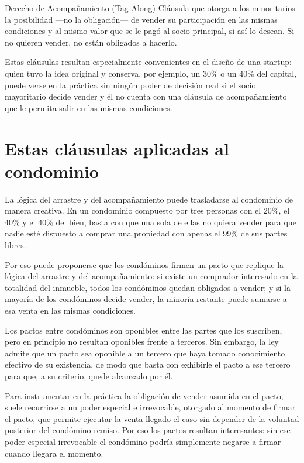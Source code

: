 \documentclass[12pt,oneside]{book}
\begin{document}
\begin{definition}{Derecho de Acompañamiento (Tag-Along)}
Cláusula que otorga a los minoritarios la posibilidad ---no la obligación--- de vender su participación en las mismas condiciones y al mismo valor que se le pagó al socio principal, si así lo desean. Si no quieren vender, no están obligados a hacerlo.
\end{definition}

Estas cláusulas resultan especialmente convenientes en el diseño de una startup: quien tuvo la idea original y conserva, por ejemplo, un 30\% o un 40\% del capital, puede verse en la práctica sin ningún poder de decisión real si el socio mayoritario decide vender y él no cuenta con una cláusula de acompañamiento que le permita salir en las mismas condiciones.

\section{Estas cláusulas aplicadas al condominio}

La lógica del arrastre y del acompañamiento puede trasladarse al condominio de manera creativa. En un condominio compuesto por tres personas con el 20\%, el 40\% y el 40\% del bien, basta con que una sola de ellas no quiera vender para que nadie esté dispuesto a comprar una propiedad con apenas el 99\% de sus partes libres.

Por eso puede proponerse que los condóminos firmen un pacto que replique la lógica del arrastre y del acompañamiento: si existe un comprador interesado en la totalidad del inmueble, todos los condóminos quedan obligados a vender; y si la mayoría de los condóminos decide vender, la minoría restante puede sumarse a esa venta en las mismas condiciones.

\begin{important}
Los pactos entre condóminos son oponibles entre las partes que los suscriben, pero en principio no resultan oponibles frente a terceros. Sin embargo, la ley admite que un pacto sea oponible a un tercero que haya tomado conocimiento efectivo de su existencia, de modo que basta con exhibirle el pacto a ese tercero para que, a su criterio, quede alcanzado por él.
\end{important}

Para instrumentar en la práctica la obligación de vender asumida en el pacto, suele recurrirse a un poder especial e irrevocable, otorgado al momento de firmar el pacto, que permite ejecutar la venta llegado el caso sin depender de la voluntad posterior del condómino remiso. Por eso los pactos resultan interesantes: sin ese poder especial irrevocable el condómino podría simplemente negarse a firmar cuando llegara el momento.
\end{document}
